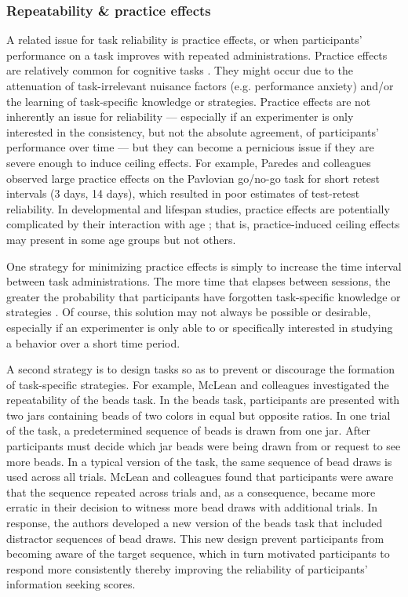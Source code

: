 \documentclass[a4paper,notitlepage,12pt]{article}
\begin{document}
\subsubsection{Repeatability \& practice effects}

A related issue for task reliability is practice effects, or when participants' performance on a task improves with repeated administrations. Practice effects are relatively common for cognitive tasks \cite{hausknecht2007retesting, scharfen2018retest}. They might occur due to the attenuation of task-irrelevant nuisance factors (e.g. performance anxiety) and/or the learning of task-specific knowledge or strategies. Practice effects are not inherently an issue for reliability --- especially if an experimenter is only interested in the consistency, but not the absolute agreement, of participants' performance over time --- but they can become a pernicious issue if they are severe enough to induce ceiling effects. For example, Paredes and colleagues \cite{paredes2021psychometric} observed large practice effects on the Pavlovian go/no-go task for short retest intervals (3 days, 14 days), which resulted in poor estimates of test-retest reliability. In developmental and lifespan studies, practice effects are potentially complicated by their interaction with age \cite{anokhin2022age, salthouse2010influence}; that is, practice-induced ceiling effects may present in some age groups but not others. 

One strategy for minimizing practice effects is simply to increase the time interval between task administrations. The more time that elapses between sessions, the greater the probability that participants have forgotten task-specific knowledge or strategies \cite{hausknecht2007retesting, scharfen2018retest}. Of course, this solution may not always be possible or desirable, especially if an experimenter is only able to or specifically interested in studying a behavior over a short time period. 

A second strategy is to design tasks so as to prevent or discourage the formation of task-specific strategies. For example, McLean and colleagues \cite{mclean2018towards} investigated the repeatability of the beads task. In the beads task, participants are presented with two jars containing beads of two colors in equal but opposite ratios. In one trial of the task, a predetermined sequence of beads is drawn from one jar. After participants must decide which jar beads were being drawn from or request to see more beads. In a typical version of the task, the same sequence of bead draws is used across all trials. McLean and colleagues found that participants were aware that the sequence repeated across trials and, as a consequence, became more erratic in their decision to witness more bead draws with additional trials. In response, the authors developed a new version of the beads task that included distractor sequences of bead draws. This new design prevent participants from becoming aware of the target sequence, which in turn motivated participants to respond more consistently thereby improving the reliability of participants' information seeking scores. 
\end{document}
